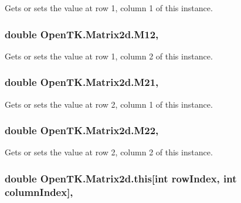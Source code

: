 Gets or sets the value at row 1, column 1 of this instance. 

\hypertarget{struct_open_t_k_1_1_matrix2d_a75f48dca6e7b41c44e1476019e5310b6}{
\subsubsection[{M12}]{\setlength{\rightskip}{0pt plus 5cm}double Open\-T\-K.\-Matrix2d.\-M12\hspace{0.3cm}{\ttfamily [get]}, {\ttfamily [set]}}}\label{struct_open_t_k_1_1_matrix2d_a75f48dca6e7b41c44e1476019e5310b6}


Gets or sets the value at row 1, column 2 of this instance. 

\hypertarget{struct_open_t_k_1_1_matrix2d_ad19b24c7efeb4c57d2e1699cfaa83ce6}{
\subsubsection[{M21}]{\setlength{\rightskip}{0pt plus 5cm}double Open\-T\-K.\-Matrix2d.\-M21\hspace{0.3cm}{\ttfamily [get]}, {\ttfamily [set]}}}\label{struct_open_t_k_1_1_matrix2d_ad19b24c7efeb4c57d2e1699cfaa83ce6}


Gets or sets the value at row 2, column 1 of this instance. 

\hypertarget{struct_open_t_k_1_1_matrix2d_a9c1ec28306c424ea27ad51e8fe902ac4}{
\subsubsection[{M22}]{\setlength{\rightskip}{0pt plus 5cm}double Open\-T\-K.\-Matrix2d.\-M22\hspace{0.3cm}{\ttfamily [get]}, {\ttfamily [set]}}}\label{struct_open_t_k_1_1_matrix2d_a9c1ec28306c424ea27ad51e8fe902ac4}


Gets or sets the value at row 2, column 2 of this instance. 

\hypertarget{struct_open_t_k_1_1_matrix2d_a116d94c4beb666660efc500e09af27f2}{
\subsubsection[{this[int row\-Index, int column\-Index]}]{\setlength{\rightskip}{0pt plus 5cm}double Open\-T\-K.\-Matrix2d.\-this\mbox{[}int row\-Index, int column\-Index\mbox{]}\hspace{0.3cm}{\ttfamily [get]}, {\ttfamily [set]}}}\label{struct_open_t_k_1_1_matrix2d_a116d94c4beb666660efc500e09af27f2}


